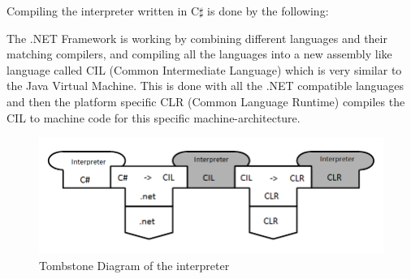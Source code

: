 Compiling the interpreter written in C$\sharp$ is done by the following:

The .NET Framework is working by combining different languages and their matching compilers, and compiling all the languages into a new assembly like language called CIL (Common Intermediate Language) \cite{CIL} which is very similar to the Java Virtual Machine. This is done with all the .NET compatible languages and then the platform specific CLR (Common Language Runtime) compiles the CIL to machine code for this specific machine-architecture.

			\begin{figure}
				\centering
				\includegraphics[scale=0.75]{rapport/3/figures/tombstone_of_the_interpreter}
				\caption{Tombstone Diagram of the interpreter} \label{fig:tombstone_of_interpreter}
			\end{figure}